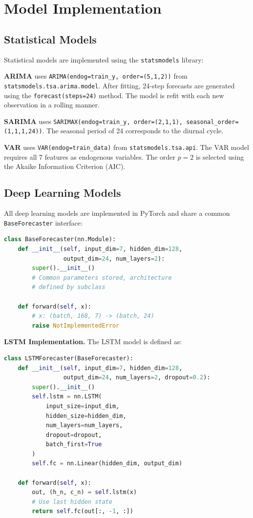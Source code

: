 \section{Model Implementation}

\subsection{Statistical Models}

Statistical models are implemented using the \texttt{statsmodels} library:

\textbf{ARIMA} uses \texttt{ARIMA(endog=train\_y, order=(5,1,2))} from \texttt{statsmodels.tsa.arima.model}. After fitting, 24-step forecasts are generated using the \texttt{forecast(steps=24)} method. The model is refit with each new observation in a rolling manner.

\textbf{SARIMA} uses \texttt{SARIMAX(endog=train\_y, order=(2,1,1), seasonal\_order=(1,1,1,24))}. The seasonal period of 24 corresponds to the diurnal cycle.

\textbf{VAR} uses \texttt{VAR(endog=train\_data)} from \texttt{statsmodels.tsa.api}. The VAR model requires all 7 features as endogenous variables. The order $p = 2$ is selected using the Akaike Information Criterion (AIC).

\subsection{Deep Learning Models}

All deep learning models are implemented in PyTorch and share a common \texttt{BaseForecaster} interface:

\begin{lstlisting}[language=Python]
class BaseForecaster(nn.Module):
    def __init__(self, input_dim=7, hidden_dim=128,
                 output_dim=24, num_layers=2):
        super().__init__()
        # Common parameters stored, architecture
        # defined by subclass
        
    def forward(self, x):
        # x: (batch, 168, 7) -> (batch, 24)
        raise NotImplementedError
\end{lstlisting}

\textbf{LSTM Implementation.} The LSTM model is defined as:

\begin{lstlisting}[language=Python]
class LSTMForecaster(BaseForecaster):
    def __init__(self, input_dim=7, hidden_dim=128,
                 output_dim=24, num_layers=2, dropout=0.2):
        super().__init__()
        self.lstm = nn.LSTM(
            input_size=input_dim,
            hidden_size=hidden_dim,
            num_layers=num_layers,
            dropout=dropout,
            batch_first=True
        )
        self.fc = nn.Linear(hidden_dim, output_dim)
    
    def forward(self, x):
        out, (h_n, c_n) = self.lstm(x)
        # Use last hidden state
        return self.fc(out[:, -1, :])
\end{lstlisting}

